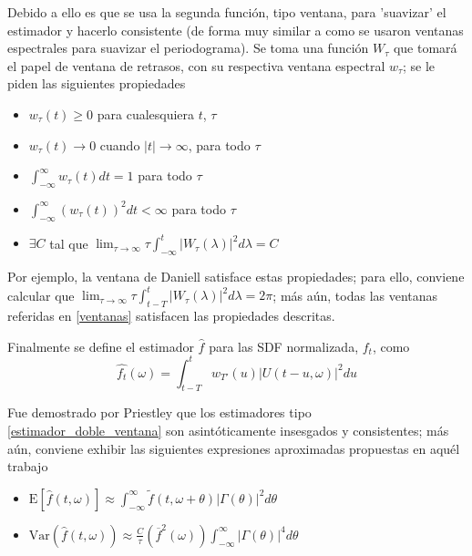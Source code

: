 \documentclass[12pt,a4paper]{mitthesis}
\newcommand{\intR}{\int_{-\infty}^{\infty}}
\newcommand{\est}[1]{\widehat{ #1 }}
\newcommand{\E}[1]{\mathrm{E}\left[ #1 \right]}
\newcommand{\Var}[1]{\mathrm{Var}\left( #1 \right)}
\newcommand{\abso}[1]{\left| #1 \right|}
\begin{document}
Debido a ello es que se usa la segunda funci\'on, tipo ventana, para 'suavizar' el estimador y 
hacerlo consistente (de forma muy similar a como se usaron ventanas espectrales para suavizar el 
periodograma).
Se toma una funci\'on $W_\tau$ que tomar\'a el papel de ventana de retrasos, con su respectiva 
ventana espectral $w_\tau$; se le piden las siguientes propiedades
\begin{itemize}
\item $w_{\tau}(t) \geq 0$ para cualesquiera $t$, $\tau$
\item $w_{\tau}(t) \rightarrow 0$ cuando $\lvert t \lvert \rightarrow \infty$, para todo $\tau$
\item $\displaystyle \int_{-\infty}^{\infty} w_{\tau}(t) dt = 1$ para todo $\tau$
\item $\displaystyle \int_{-\infty}^{\infty} \left( w_{\tau}(t) \right)^{2} dt < \infty$ para todo $\tau$
\item $\exists C$ tal que  
$\displaystyle \lim_{\tau\rightarrow\infty} \tau \int_{-\infty}^{t} \abso{ W_{\tau}(\lambda) }^{2} d\lambda = C$
\end{itemize}

Por ejemplo, la ventana de Daniell satisface estas propiedades; para ello, conviene calcular que
$\lim_{\tau\rightarrow\infty} \tau \int_{t-T}^{t} \lvert W_{\tau}(\lambda) \lvert^{2} d\lambda = 2\pi$;
m\'as a\'un, todas las ventanas referidas en \ref{ventanas} satisfacen las propiedades descritas.

Finalmente se define el estimador $\est{f}$ para las SDF normalizada, $f_t$, como
\begin{equation*}
\widehat{f_t}(\omega) = \int_{t-T}^{t} w_{T'}(u) \lvert U(t-u,\omega) \lvert^{2} du
\label{estimador_doble_ventana}
\end{equation*}

Fue demostrado por Priestley \cite{Priestley65} que los estimadores tipo 
\ref{estimador_doble_ventana} son asint\'oticamente insesgados y consistentes; m\'as a\'un, 
conviene exhibir las siguientes expresiones aproximadas propuestas en aqu\'el trabajo
\begin{itemize}
\item $\displaystyle
\E{\est{f}(t,\omega)} \approx 
\intR \widetilde{f}(t,\omega+\theta) \abso{\Gamma(\theta)}^{2} d\theta$
\item $\displaystyle
\Var{\est{f}(t,\omega)} \approx \frac{C}{\tau} \left( \overline{f}^{2}(\omega) \right)
\intR \abso{\Gamma(\theta)}^{4} d\theta $
\end{itemize}
\end{document}
